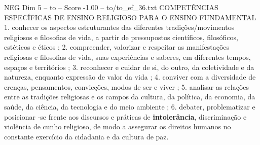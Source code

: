 \begin{textsample}{NEG Dim 5 – to – Score -1.00 – to/to\_ef\_36.txt}  \label{ex:f5_neg_262}
COMPETÊNCIAS ESPECÍFICAS DE ENSINO RELIGIOSO PARA O ENSINO FUNDAMENTAL 1. conhecer os aspectos estruturantes das diferentes tradições/movimentos religiosos e filosofias de vida, a partir de pressupostos científicos, filosóficos, estéticos e éticos ; 2. compreender, valorizar e respeitar as manifestações religiosas e filosofias de vida, suas experiências e saberes, em diferentes tempos, espaços e territórios ; 3. reconhecer e cuidar de si, do outro, da coletividade e da natureza, enquanto expressão de valor da vida ; 4. conviver com a diversidade de crenças, pensamentos, convicções, modos de ser e viver ; 5. analisar as relações entre as tradições religiosas e os campos da cultura, da política, da economia, da saúde, da ciência, da tecnologia e do meio ambiente ; 6. debater, problematizar e posicionar -se frente aos discursos e práticas de \textbf{intolerância}, discriminação e violência de cunho religioso, de modo a assegurar os direitos humanos no constante exercício da cidadania e da cultura de paz.

\end{textsample}
